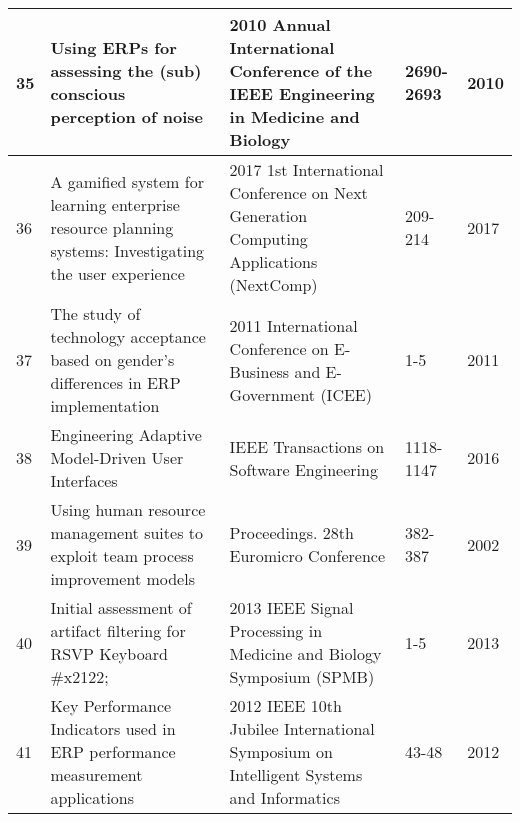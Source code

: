 \begin{landscape}
\begin{longtable}{||p{1.7cm}|p{11.0cm}|p{7.0cm}|p{1.7cm}|p{1cm}||}
	35 & Using ERPs for assessing the (sub) conscious perception of noise & 2010 Annual International Conference of the IEEE Engineering in Medicine and Biology & 2690-2693 & 2010 \\ 
	\hline
	36 & A gamified system for learning enterprise resource planning systems: Investigating the user experience & 2017 1st International Conference on Next Generation Computing Applications (NextComp) & 209-214 & 2017 \\ 
	\hline
	37 & The study of technology acceptance based on gender's differences in ERP implementation & 2011 International Conference on E-Business and E-Government (ICEE) & 1-5 & 2011 \\ 
	\hline
	38 & Engineering Adaptive Model-Driven User Interfaces & IEEE Transactions on Software Engineering & 1118-1147 & 2016 \\ 
	\hline
	39 & Using human resource management suites to exploit team process improvement models & Proceedings. 28th Euromicro Conference & 382-387 & 2002 \\ 
	\hline
	40 & Initial assessment of artifact filtering for RSVP Keyboard #x2122; & 2013 IEEE Signal Processing in Medicine and Biology Symposium (SPMB) & 1-5 & 2013 \\ 
	\hline
	41 & Key Performance Indicators used in ERP performance measurement applications & 2012 IEEE 10th Jubilee International Symposium on Intelligent Systems and Informatics & 43-48 & 2012  
	\hline
 \end{longtable}
\end{landscape}
